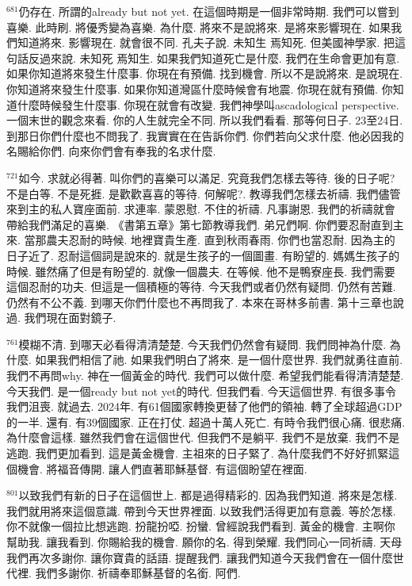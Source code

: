 \documentclass{book}
\begin{document}
$^{681}$仍存在.
所謂的already but not yet.
在這個時期是一個非常時期.
我們可以嘗到喜樂.
此時刷.
將優秀變為喜樂.
為什麼.
將來不是說將來.
是將來影響現在.
如果我們知道將來.
影響現在.
就會很不同.
孔夫子說.
未知生 焉知死.
但美國神學家.
把這句話反過來說.
未知死 焉知生.
如果我們知道死亡是什麼.
我們在生命會更加有意.
如果你知道將來發生什麼事.
你現在有預備.
找到機會.
所以不是說將來.
是說現在.
你知道將來發生什麼事.
如果你知道灣區什麼時候會有地震.
你現在就有預備.
你知道什麼時候發生什麼事.
你現在就會有改變.
我們神學叫ascadological perspective.
一個末世的觀念來看.
你的人生就完全不同.
所以我們看看.
那等何日子.
23至24日.
到那日你們什麼也不問我了.
我實實在在告訴你們.
你們若向父求什麼.
他必因我的名賜給你們.
向來你們會有奉我的名求什麼.

$^{721}$如今.
求就必得著.
叫你們的喜樂可以滿足.
究竟我們怎樣去等待.
後的日子呢?不是白等.
不是死捱.
是歡歡喜喜的等待.
何解呢?.
教導我們怎樣去祈禱.
我們儘管來到主的私人寶座面前.
求連率.
蒙恩慰.
不住的祈禱.
凡事謝恩.
我們的祈禱就會帶給我們滿足的喜樂.
《書第五章》第七節教導我們.
弟兄們啊.
你們要忍耐直到主來.
當那農夫忍耐的時候.
地裡寶貴生產.
直到秋雨春雨.
你們也當忍耐.
因為主的日子近了.
忍耐這個詞是說來的.
就是生孩子的一個圖畫.
有盼望的.
媽媽生孩子的時候.
雖然痛了但是有盼望的.
就像一個農夫.
在等候.
他不是鴨寮座長.
我們需要這個忍耐的功夫.
但這是一個積極的等待.
今天我們或者仍然有疑問.
仍然有苦難.
仍然有不公不義.
到哪天你們什麼也不再問我了.
本來在哥林多前書.
第十三章也說過.
我們現在面對鏡子.

$^{761}$模糊不清.
到哪天必看得清清楚楚.
今天我們仍然會有疑問.
我們問神為什麼.
為什麼.
如果我們相信了祂.
如果我們明白了將來.
是一個什麼世界.
我們就勇往直前.
我們不再問why.
神在一個黃金的時代.
我們可以做什麼.
希望我們能看得清清楚楚.
今天我們.
是一個ready but not yet的時代.
但我們看.
今天這個世界.
有很多事令我們沮喪.
就過去.
2024年.
有61個國家轉換更替了他們的領袖.
轉了全球超過GDP的一半.
還有.
有39個國家.
正在打仗.
超過十萬人死亡.
有時令我們很心痛.
很悲痛.
為什麼會這樣.
雖然我們會在這個世代.
但我們不是躺平.
我們不是放棄.
我們不是逃跑.
我們更加看到.
這是黃金機會.
主祖來的日子緊了.
為什麼我們不好好抓緊這個機會.
將福音傳開.
讓人們直著耶穌基督.
有這個盼望在裡面.

$^{801}$以致我們有新的日子在這個世上.
都是過得精彩的.
因為我們知道.
將來是怎樣.
我們就用將來這個意識.
帶到今天世界裡面.
以致我們活得更加有意義.
等於怎樣.
你不就像一個拉比想逃跑.
扮龍扮啞.
扮蠻.
曾經說我們看到.
黃金的機會.
主啊你幫助我.
讓我看到.
你賜給我的機會.
願你的名.
得到榮耀.
我們同心一同祈禱.
天母我們再次多謝你.
讓你寶貴的話語.
提醒我們.
讓我們知道今天我們會在一個什麼世代裡.
我們多謝你.
祈禱奉耶穌基督的名銜.
阿們.
\newpage
\end{document}
